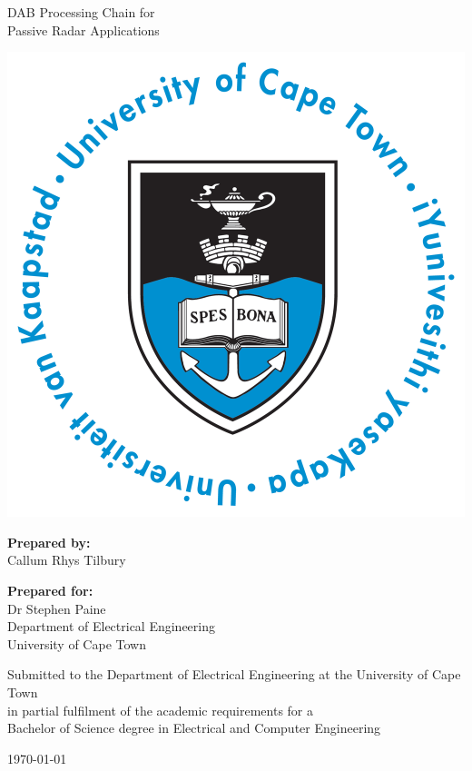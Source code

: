 \thispagestyle{empty}
\begin{center}
    
\Huge

\vspace{5cm}

DAB Processing Chain for\\Passive Radar Applications

\vspace{2.5cm}

\includegraphics[width=0.4\linewidth]{FrontMatter/UCT_logo.png}

\vfill

\large
\textbf{Prepared by:}\\
Callum Rhys Tilbury

\vspace{1cm}

\textbf{Prepared for:}\\
Dr Stephen Paine\\
Department of Electrical Engineering\\
University of Cape Town

\vspace{2cm}

\small
Submitted to the Department of Electrical Engineering at the University of Cape Town\\
in partial fulfilment of the academic requirements for a\\
Bachelor of Science degree in Electrical and Computer Engineering

\vspace{2cm}

\today


\end{center}
